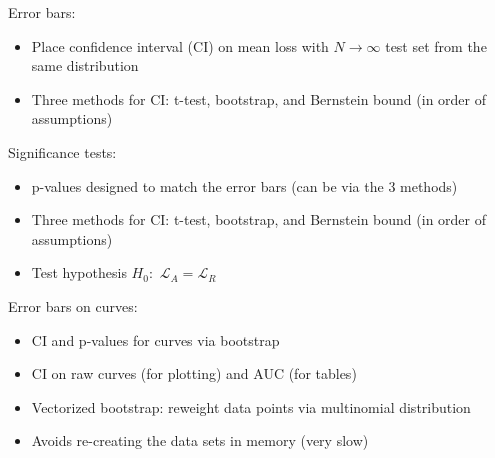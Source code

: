\documentclass[a0,landscape]{a0poster}
\newcommand{\Loss}{\mathcal{L}}
\begin{document}
\begin{multicols}{3}
Error bars:
\begin{itemize}
  \item Place confidence interval (CI) on mean loss with $N \rightarrow \infty$ test set from the same distribution
  \item Three methods for CI: t-test, bootstrap, and Bernstein bound (in order of assumptions)
\end{itemize}

Significance tests:
\begin{itemize}
  \item p-values designed to match the error bars (can be via the 3 methods)
  \item Three methods for CI: t-test, bootstrap, and Bernstein bound (in order of assumptions)
  \item Test hypothesis $H_0$:~$\Loss_A = \Loss_R$
\end{itemize}

Error bars on curves:
\begin{itemize}
  \item CI and p-values for curves via bootstrap
  \item CI on raw curves (for plotting) and AUC (for tables)
  \item Vectorized bootstrap: reweight data points via multinomial distribution
  \item Avoids re-creating the data sets in memory (very slow)
\end{itemize}

\end{multicols}
\end{document}
